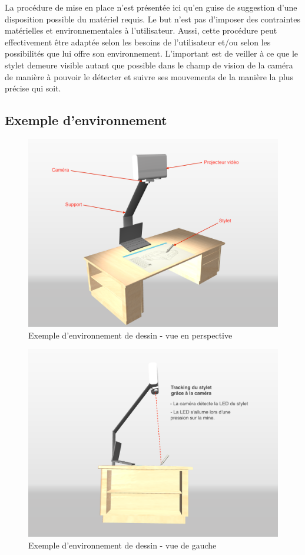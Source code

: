 \documentclass[11pt,a4paper,oldfontcommands]{memoir}
\begin{document}
La procédure de mise en place n'est présentée ici qu'en guise de suggestion d'une disposition possible du matériel requis. Le but n'est pas d'imposer des contraintes matérielles et environnementales à l'utilisateur. Aussi, cette procédure peut effectivement être adaptée selon les besoins de l'utilisateur et/ou selon les possibilités que lui offre son environnement. L'important est de veiller à ce que le stylet demeure visible autant que possible dans le champ de vision de la caméra de manière à pouvoir le détecter et suivre ses mouvements de la manière la plus précise qui soit.

\subsection{Exemple d'environnement}

\begin{figure}[h]
\centering
\includegraphics[angle=90, scale=0.15]{images/drawing-environment.png}
\caption{Exemple d'environnement de dessin - vue en perspective}
\end{figure}

\newpage

\begin{figure}[h]
\centering
\includegraphics[angle=90, scale=0.15]{images/drawing-environment-side.png}
\caption{Exemple d'environnement de dessin - vue de gauche}
\end{figure}
\end{document}

